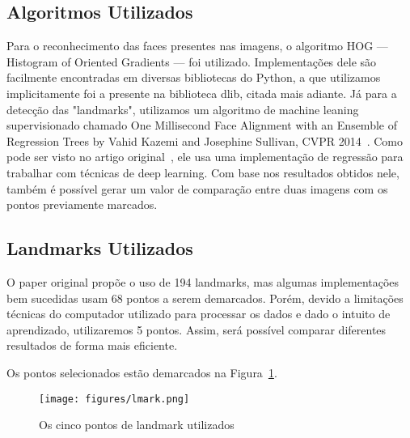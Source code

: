 \documentclass[twoside,conference,a4paper]{IEEEtran}
\begin{document}
\subsection{Algoritmos Utilizados}
Para o reconhecimento das faces presentes nas imagens, o algoritmo HOG --- Histogram of Oriented Gradients --- foi utilizado. Implementações dele são facilmente encontradas em diversas bibliotecas do Python, a que utilizamos implicitamente foi a presente na biblioteca dlib, citada mais adiante.
Já para a detecção das "landmarks", utilizamos um algoritmo de machine leaning supervisionado chamado One Millisecond Face Alignment with an Ensemble of Regression Trees by Vahid Kazemi and Josephine Sullivan, CVPR 2014~\cite{paper}. Como pode ser visto no artigo original~\cite{paper}, ele usa uma implementação de regressão para trabalhar com técnicas de deep learning. Com base nos resultados obtidos nele, também é possível gerar um valor de comparação entre duas imagens com os pontos previamente marcados.
\subsection{Landmarks Utilizados}
O paper original propõe o uso de 194 landmarks, mas algumas implementações bem sucedidas usam 68 pontos a serem demarcados. Porém, devido a limitações técnicas do computador utilizado para processar os dados e dado o intuito de aprendizado, utilizaremos 5 pontos. Assim, será possível comparar diferentes resultados de forma mais eficiente.

Os pontos selecionados estão demarcados na Figura~\ref{fig:lmark}.
\begin{figure}
    \centering
    \texttt{[image: figures/lmark.png]}
    \caption{Os cinco pontos de landmark utilizados}
    \label{fig:lmark}
\end{figure}
\end{document}
